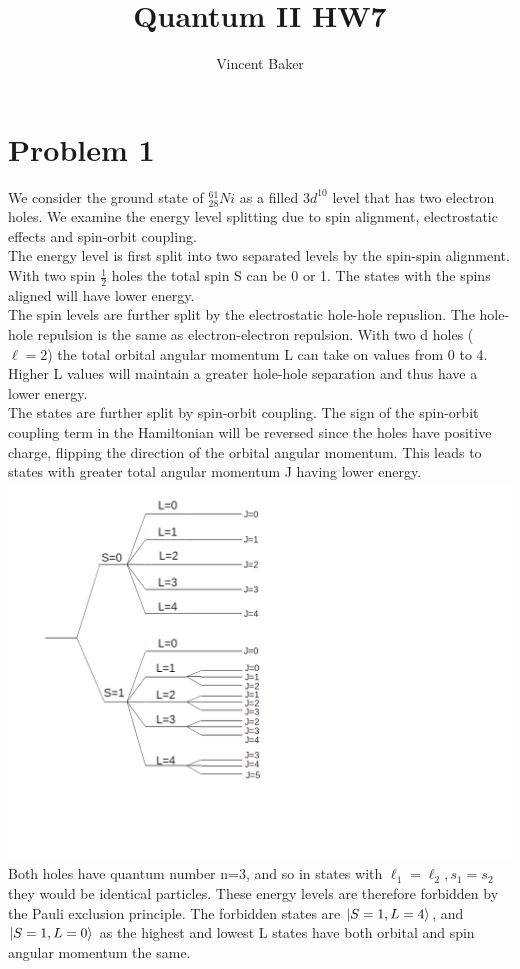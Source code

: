 \documentclass[a4paper,11pt]{article}
\title{Quantum II HW7}
\author{Vincent Baker}
\numberwithin{equation}{section}
\begin{document}
\maketitle

\section{Problem 1}
We consider the ground state of $^{61}_{28}Ni$ as a filled $3d^{10}$ level that has two electron holes.
We examine the energy level splitting due to spin alignment, electrostatic effects and spin-orbit coupling.\\

The energy level is first split into two separated levels by the spin-spin alignment. 
With two spin $\frac{1}{2}$ holes the total spin S can be 0 or 1.
The states with the spins aligned will have lower energy.\\
The spin levels are further split by the electrostatic hole-hole repuslion. 
The hole-hole repulsion is the same as electron-electron repulsion.
With two d holes ($\ell=2$) the total orbital angular momentum L can take on values from 0 to 4.
Higher L values will maintain a greater hole-hole separation and thus have a lower energy.\\
The states are further split by spin-orbit coupling. 
The sign of the spin-orbit coupling term in the Hamiltonian will be reversed since the holes have positive charge, flipping the direction of the orbital angular momentum.
This leads to states with greater total angular momentum J having lower energy.
\\
\includegraphics{LSsplitting}
\\
Both holes have quantum number n=3, and so in states with $\ell_1=\ell_2, s_1=s_2$ they would be identical particles. 
These energy levels are therefore forbidden by the Pauli exclusion principle. 
The forbidden states are $\ket{S=1,L=4}$, and $\ket{S=1,L=0}$ as the highest and lowest L states have both orbital and spin angular momentum the same.
\end{document}
